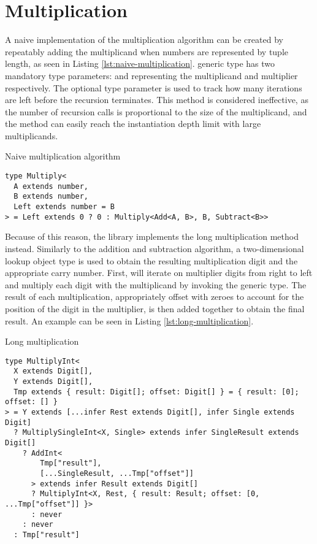 \section{Multiplication}

A naive implementation of the multiplication algorithm can be created by repeatably adding the multiplicand when numbers are represented by tuple length, as seen in Listing \ref{lst:naive-multiplication}.  generic type has two mandatory type parameters:  and  representing the multiplicand and multiplier respectively. The optional type parameter  is used to track how many iterations are left before the recursion terminates. This method is considered ineffective, as the number of recursion calls is proportional to the size of the multiplicand, and the method can easily reach the instantiation depth limit with large multiplicands.

\begin{listing}[ht]
  \caption{Naive multiplication algorithm}\label{lst:naive-multiplication}
  \begin{verbatim}
type Multiply<
  A extends number,
  B extends number,
  Left extends number = B
> = Left extends 0 ? 0 : Multiply<Add<A, B>, B, Subtract<B>>
\end{verbatim}
\end{listing}

Because of this reason, the library implements the long multiplication method instead. Similarly to the addition and subtraction algorithm, a two-dimensional lookup object type is used to obtain the resulting multiplication digit and the appropriate carry number. First,  will iterate on multiplier digits from right to left and multiply each digit with the multiplicand by invoking the  generic type. The result of each multiplication, appropriately offset with zeroes to account for the position of the digit in the multiplier, is then added together to obtain the final result. An example can be seen in Listing \ref{lst:long-multiplication}.

\begin{listing}[ht]
  \caption{Long multiplication}\label{lst:long-multiplication}
  \begin{verbatim}
type MultiplyInt<
  X extends Digit[],
  Y extends Digit[],
  Tmp extends { result: Digit[]; offset: Digit[] } = { result: [0]; offset: [] }
> = Y extends [...infer Rest extends Digit[], infer Single extends Digit]
  ? MultiplySingleInt<X, Single> extends infer SingleResult extends Digit[]
    ? AddInt<
        Tmp["result"],
        [...SingleResult, ...Tmp["offset"]]
      > extends infer Result extends Digit[]
      ? MultiplyInt<X, Rest, { result: Result; offset: [0, ...Tmp["offset"]] }>
      : never
    : never
  : Tmp["result"]
\end{verbatim}
\end{listing}

